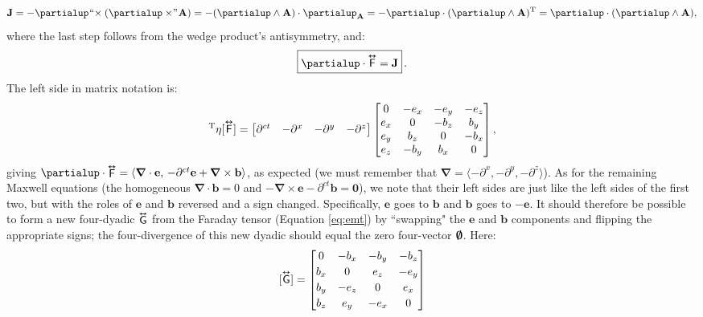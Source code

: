 \documentclass[12pt]{article}
\renewcommand{\vv}[1]{\mathbf{#1}}
\newcommand{\del}{\boldsymbol{\nabla}}
\newcommand{\tightoverset}[2]{%
  \mathop{#2}\limits^{\vbox to -.5ex{\kern-0.75ex\hbox{$#1$}\vss}}}
\newcommand{\inlinedy}[1]{\tightoverset{\text{\tiny$\bm\leftrightarrow$}}{#1}}
\newcommand{\capdy}[1]{ \overset{ \text{\tiny$\bm\leftrightarrow$} }{\vphantom{\text{\small{A}}}\smash{#1}} }
\begin{document}
\begin{equation*}
\vv J = - \partialup \mkern1mu `` \mkern-4mu \times ( \partialup \times \mkern-4mu " \mkern1mu \vv A ) = - ( \partialup \wedge \vv A ) \cdot \partialup_{\vv A} = - \partialup \cdot ( \partialup \wedge \vv A )^\mathrm{T} = \partialup \cdot (\partialup \wedge \vv A),
\end{equation*}
where the last step follows from the wedge product's antisymmetry, and:
\begin{equation}\label{eq:ime}
\boxed{ \vphantom{A_{A_A}} \partialup \cdot \capdy{\mathsf{F}} = \vv J } \, .
\end{equation}
The left side in matrix notation is:
\begin{equation*}
[\partialup]^{\mathrm{T}} \eta [\capdy{\mathsf{F}}]
=
\begin{bmatrix}
\partial^{ct} & - \partial^x & - \partial^y & - \partial^z
\end{bmatrix}
\begin{bmatrix}
0 & -e_x & -e_y & -e_z \\
e_x & 0 & -b_z & b_y \\
e_y & b_z & 0 & -b_x \\
e_z & -b_y & b_x & 0
\end{bmatrix} ,
\end{equation*}
giving $\partialup \cdot \inlinedy{\mathsf{F}} = \langle \del \cdot \vv e , \, - \partial^{ct} \vv e + \del \times \vv b \rangle$, as expected (we must remember that ${\del = \langle - \partial^x , - \partial^y , - \partial^z \rangle}$). As for the remaining Maxwell equations (the homogeneous $\del \cdot \vv b = 0$ and ${ - \del \times \vv e - \partial^{ct} \vv b = \vv 0 }$), we note that their left sides are just like the left sides of the first two, but with the roles of $\vv e$ and $\vv b$ reversed and a sign changed. Specifically, $\vv e$ goes to $\vv b$ and $\vv b$ goes to $- \vv e$. It should therefore be possible to form a new four-dyadic $\inlinedy{\mathsf{G}}$ from the Faraday tensor (Equation \ref{eq:emt}) by ``swapping" the $\vv e$ and $\vv b$ components and flipping the appropriate signs; the four-divergence of this new dyadic should equal the zero four-vector $\textrm{\mbox{\boldmath $\emptyset$}}$. Here:
\begin{equation}\label{eq:mt}
[ \capdy{\mathsf{G}} ]
=
\begin{bmatrix}
0 & -b_x & -b_y & -b_z \\[.5ex]
b_x & 0 & e_z & -e_y \\[.5ex]
b_y & -e_z & 0 & e_x \\[.5ex]
b_z & e_y & -e_x & 0
\end{bmatrix}
\end{equation}
\end{document}
